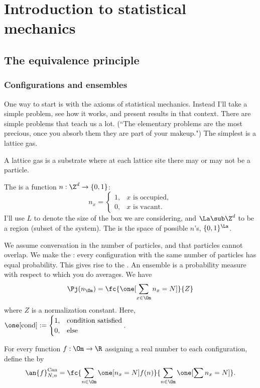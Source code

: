 \chapter{Introduction to statistical mechanics}


\section{The equivalence principle}
\subsection{Configurations and ensembles}
One way to start is with the axioms of statistical mechanics. Instead I'll take a simple problem, see how it works, and present results in that context. There are simple problems that teach us a lot. (``The elementary problems are the most precious, once you absorb them they are part of your makeup.") The simplest is a lattice gas.

A lattice gas is a substrate where at each lattice site there may or may not be a particle. 

The  is a function $n:\Z^d\to \{0,1\}$:
\[
n_x=\begin{cases}
1,&\text{$x$ is occupied},\\
0,&\text{$x$ is vacant}.
\end{cases}
\]
I'll use $L$ to denote the size of the box we are considering, and $\La\sub \Z^d$ to be a region (subset of the system). The  is the space of possible $n$'s, $\{0,1\}^{\La}$.

We assume conversation in the number of particles, and that particles cannot overlap. %
We make the : every configuration with the same number of particles has equal probability. This gives rise to the . An ensemble is a probability measure with respect to which you do averages. We have
\[
\Pj(n_{\Om})= \fc{\one[\sum_{x\in \Om}n_x=N]}{Z}
\]
where $Z$ is a normalization constant.
Here, $\one[\text{cond}] := \begin{cases}
1,&\text{condition satisfied}\\
0,&\text{else}
\end{cases}$.

For every function $f:\Om\to \R$ assigning a real number to each configuration, define the  by
\[
\an{f}_{N,n}^{\text{Can}} = \fc{\sum_{n\in \Om} \one[n_x=N] f(n)}{\sum_{n\in \Om} \one[\sum n_x=N]}.
\]

